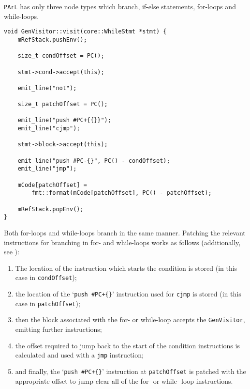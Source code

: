 \texttt{PArL} has only three node types which branch, if-else
statements, for-loops and while-loops.

\begin{lstlisting}[caption={The \texttt{visit(WhileStmt *)}
method in the \texttt{GenVisitor} class
(ir\_gen/GenVisitor.cpp).}, label=lst:whilestmtgen]
void GenVisitor::visit(core::WhileStmt *stmt) {
    mRefStack.pushEnv();

    size_t condOffset = PC();

    stmt->cond->accept(this);

    emit_line("not");

    size_t patchOffset = PC();

    emit_line("push #PC+{{}}");
    emit_line("cjmp");

    stmt->block->accept(this);

    emit_line("push #PC-{}", PC() - condOffset);
    emit_line("jmp");

    mCode[patchOffset] =
        fmt::format(mCode[patchOffset], PC() - patchOffset);

    mRefStack.popEnv();
}
\end{lstlisting}

Both for-loops and while-loops branch in the same manner.
Patching the relevant instructions for branching in for- and
while-loops works as follows (additionally, see
):

\begin{enumerate}
    \item The location of the instruction which starts the
        condition is stored (in this case in
        \texttt{condOffset});
    \item the location of the `\texttt{push \#PC+\{\}}'
        instruction used for \texttt{cjmp} is stored (in this
        case in \texttt{patchOffset});
    \item then the block associated with the for- or while-loop
        accepts the \texttt{GenVisitor}, emitting further
        instructions;
    \item the offset required to jump back to the
        start of the condition instructions is calculated and
        used with a \texttt{jmp} instruction;
    \item and finally, the `\texttt{push \#PC+\{\}}' instruction
        at \texttt{patchOffset} is patched with the appropriate
        offset to jump clear all of the for- or while- loop
        instructions.
\end{enumerate}

